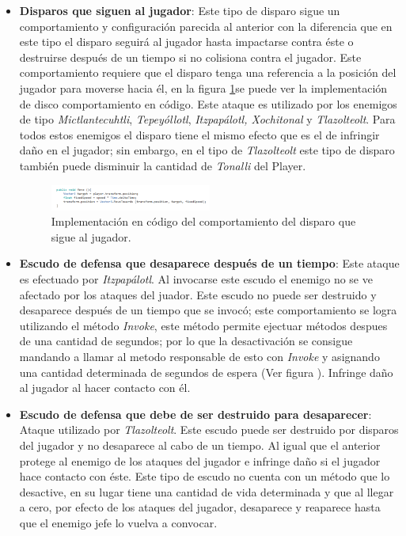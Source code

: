 \begin{itemize}
		\item \textbf{Disparos que siguen al jugador}: Este tipo de disparo sigue un 
		comportamiento y configuración parecida al anterior con la diferencia que en 
		este tipo el disparo seguirá al jugador hasta impactarse contra éste o 
		destruirse después de un tiempo si no colisiona contra el jugador. Este 
		comportamiento requiere que el disparo tenga una referencia a la posición del 
		jugador para moverse hacia él, en la figura \ref{fig:FollowedShot}se puede ver 
		la implementación de disco comportamiento en código. Este ataque es utilizado 
		por los enemigos de tipo \textit{Mictlantecuhtli}, \textit{Tepeyóllotl}, 
		\textit{Itzpapálotl, Xochitonal} y \textit{Tlazolteolt}. Para todos estos 
		enemigos el disparo tiene el mismo efecto que es el de infringir 
		daño en el jugador; sin embargo, en el tipo de \textit{Tlazolteolt} este tipo de 
		disparo también puede disminuir la cantidad de \textit{Tonalli} del Player.
			
			\begin{figure}[h]
    			\centering
    			\includegraphics[width=0.5\textwidth]{03TrabajoRealizado/imagenes/disparoSigue.png}
    			\caption{Implementación en código del comportamiento del disparo que sigue al jugador.}
    			\label{fig:FollowedShot}
			\end{figure}		
		
		\item \textbf{Escudo de defensa que desaparece después de un tiempo}: Este 
		ataque es efectuado por \textit{Itzpapálotl}. Al invocarse este escudo el 
		enemigo no se ve afectado por los ataques del juador. Este escudo no puede ser 
		destruido y desaparece después de un tiempo que se invocó; este comportamiento 
		se logra utilizando el método \textit{Invoke}, este método permite ejectuar 
		métodos despues de una cantidad de segundos; por lo que la desactivación se 
		consigue mandando a llamar al metodo responsable de esto con \textit{Invoke} 
		y asignando una cantidad determinada de segundos de espera (Ver figura ). 
		Infringe daño al jugador al hacer contacto con él.

		\item \textbf{Escudo de defensa que debe de ser destruido para desaparecer}: 
		Ataque utilizado por \textit{Tlazolteolt}. Este escudo puede ser destruido 
		por disparos del jugador y no desaparece al cabo de un tiempo. Al igual que el 
		anterior protege al enemigo de los ataques del jugador e infringe daño si el 
		jugador hace contacto con éste. Este tipo de escudo no cuenta con un método 
		que lo desactive, en su lugar tiene una cantidad de vida determinada y que 
		al llegar a cero, por efecto de los ataques del jugador, desaparece y reaparece 
		hasta que el enemigo jefe lo vuelva a convocar.


\end{itemize}

